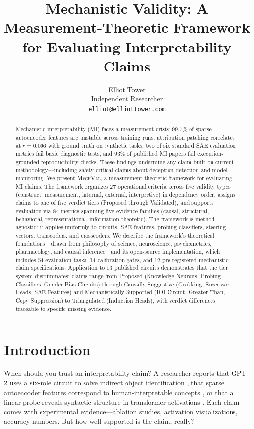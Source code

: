 \documentclass[10pt]{article}
\title{Mechanistic Validity: A Measurement-Theoretic Framework for Evaluating Interpretability Claims}
\author{Elliot Tower \\
Independent Researcher \\
\texttt{elliot@elliottower.com}}
\newcommand{\mechval}{\textsc{MechVal}}
\begin{document}
\maketitle

\begin{abstract}
Mechanistic interpretability (MI) faces a measurement crisis: 99.7\% of sparse autoencoder features are unstable across training runs, attribution patching correlates at $r = 0.006$ with ground truth on synthetic tasks, two of six standard SAE evaluation metrics fail basic diagnostic tests, and 93\% of published MI papers fail execution-grounded reproducibility checks. These findings undermine any claim built on current methodology---including safety-critical claims about deception detection and model monitoring. We present \mechval{}, a measurement-theoretic framework for evaluating MI claims. The framework organizes 27 operational criteria across five validity types (construct, measurement, internal, external, interpretive) in dependency order, assigns claims to one of five verdict tiers (Proposed through Validated), and supports evaluation via 84 metrics spanning five evidence families (causal, structural, behavioral, representational, information-theoretic). The framework is method-agnostic: it applies uniformly to circuits, SAE features, probing classifiers, steering vectors, transcoders, and crosscoders. We describe the framework's theoretical foundations---drawn from philosophy of science, neuroscience, psychometrics, pharmacology, and causal inference---and its open-source implementation, which includes 54 evaluation tasks, 14 calibration gates, and 12 pre-registered mechanistic claim specifications. Application to 13 published circuits demonstrates that the tier system discriminates: claims range from Proposed (Knowledge Neurons, Probing Classifiers, Gender Bias Circuits) through Causally Suggestive (Grokking, Successor Heads, SAE Features) and Mechanistically Supported (IOI Circuit, Greater-Than, Copy Suppression) to Triangulated (Induction Heads), with verdict differences traceable to specific missing evidence.
\end{abstract}

\section{Introduction}
\label{sec:intro}

When should you trust an interpretability claim? A researcher reports that GPT-2 uses a six-role circuit to solve indirect object identification \citep{wang2023interpretability}, that sparse autoencoder features correspond to human-interpretable concepts \citep{cunningham2023sparse}, or that a linear probe reveals syntactic structure in transformer activations \citep{belinkov2022probing}. Each claim comes with experimental evidence---ablation studies, activation visualizations, accuracy numbers. But how well-supported is the claim, really?
\end{document}
